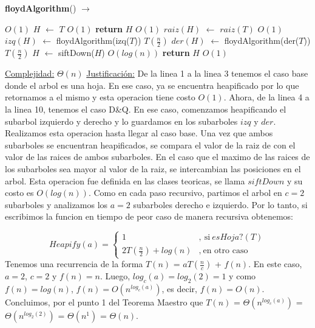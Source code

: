 \documentclass[10pt,a4paper]{article}
\begin{document}
\begin{algorithm}[H]{\textbf{floydAlgorithm}() $\to$ }
	\begin{algorithmic}[1]
		 		 								\Comment $O(1)$
		\State $H$ $\gets$ $T$ 									\Comment $O(1)$
		\State \textbf{return} $H$ 								\Comment $O(1)$
		\Else
		\State $raiz(H)$ $\gets$ $raiz(T)$ 						\Comment $O(1)$
		\State $izq(H)$ $\gets$ floydAlgorithm(izq($T$))    	\Comment $T(\frac{n}{2})$
		\State $der(H)$ $\gets$ floydAlgorithm(der($T$))    	\Comment $T(\frac{n}{2})$
		\State $H$ $\gets$ siftDown($H$) 						\Comment $O(log(n))$
		\State \textbf{return} $H$ 								\Comment $O(1)$
		\EndIf
		
		\medskip
		\Statex \underline{Complejidad:} $\Theta(n)$
		\Statex \underline{Justificación:} De la linea 1 a la linea 3 tenemos el caso base donde el arbol es una hoja. En ese caso, ya se encuentra heapificado por lo que retornamos a el mismo y esta operacion tiene costo $O(1)$. 
		\newline
		\newline
		Ahora, de la linea 4 a la linea 10, tenemos el caso D\&Q. En ese caso, comenzamos heapificando el subarbol izquierdo y derecho y lo guardamos en los subarboles $izq$ y $der$. Realizamos esta operacion hasta llegar al caso base. Una vez que ambos subarboles se encuentran heapificados, se compara el valor de la raiz de con el valor de las raices de ambos subarboles. En el caso que el maximo de las raices de los subarboles sea mayor al valor de la raiz, se intercambian las posiciones en el arbol. Esta operacion fue definida en las clases teoricas, se llama $siftDown$ y su costo es $O(log(n))$.       
		\newline
		\newline
		Como en cada paso recursivo, partimos el arbol en $c = 2$ subarboles y analizamos los $a = 2$ subarboles derecho e izquierdo. Por lo tanto, si escribimos la funcion en tiempo de peor caso de manera recursiva obtenemos: 
		
		\[ Heapify(a) =  
		\left \{
		\begin{aligned}
			1    &,\   \text{si} \ esHoja?(T)\\
			2T(\frac{n}{2}) + log(n)     
			&,\   \text{en otro caso} 
		\end{aligned}
		\right .
		\] 
		Tenemos una recurrencia de la forma $T(n)$ = $aT(\frac{n}{c})$ + $f(n)$. En este caso, $a = 2$, $c = 2$ y $f(n) = n$. Luego, $log_{c}(a) = log_{2}(2) = 1$ y como $f(n) = log(n)$, $f(n) = O(n^{log_{c}(a)})$, es decir, $f(n) = O(n)$. Concluimos, por el punto 1 del Teorema Maestro que $T(n)$ = $\Theta(n^{log_{c}(a)})$ = $\Theta(n^{log_{2}(2)})$ = $\Theta(n^{1})$ = $\Theta(n)$.   
	\end{algorithmic}
\end{algorithm}
\end{document}
